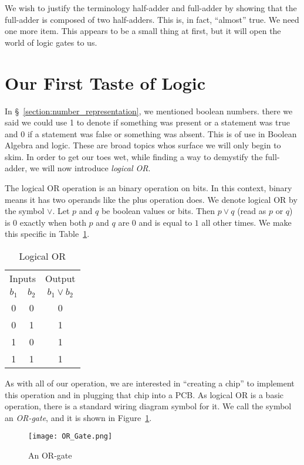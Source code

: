 We wish to justify the terminology half-adder and full-adder by showing that the full-adder is composed of two half-adders.  This is, in fact, ``almost'' true.  We need one more item.  This appears to be a small thing at first, but it will open the world of logic gates to us.

\section{Our First Taste of Logic}
In \S~\ref{section:number_representation}, we mentioned boolean numbers.  there we said we could use 1 to denote if something was present or a statement was true and 0 if a statement was false or something was absent. This is of use in Boolean Algebra and logic.  These are broad topics whos surface we will only begin to skim. In order to get our toes wet, while finding a way to demystify the full-adder, we will now introduce \emph{logical OR}.

The logical OR operation is an binary operation on bits.  In this context, binary means it has two operands like the plus operation does.  We denote logical OR by the symbol $\vee $.  Let $p$ and $q$ be boolean values or bits.  Then $p\vee  q$ (read as $p$ or $q$) is $0$ exactly when both $p$ and $q$ are $0$ and is equal to $1$ all other times.  We make this specific in Table~\ref{table:logical_or}.
\begin{table}
			\begin{center}			
		\begin{tabular}{ccc}
			\multicolumn{2}{c}{Inputs} & Output \\
			$b_1$ & $b_2$ & $b_1\vee b_2$  \\ \hline
			0     & 0     &    0 \\
			0     & 1     &    1  \\
			1     & 0     &    1  \\
			1     & 1     &   1
		\end{tabular}
	\end{center}
\caption{Logical OR}\label{table:logical_or}
\end{table}

As with all of our operation, we are interested in ``creating a chip'' to implement this operation and in plugging that chip into a PCB.  As logical OR is a basic operation, there is a standard wiring diagram symbol for it.  We call the symbol an \emph{OR-gate}, and it is shown in Figure~\ref{figure:or_gate}.
\begin{figure}
	\begin{center}			
		\texttt{[image: OR\_Gate.png]}
	\end{center}
\caption{An OR-gate}\label{figure:or_gate}
\end{figure}

